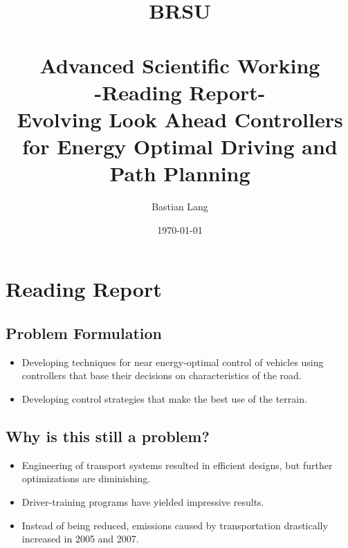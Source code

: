 \documentclass[paper=a4, fontsize=11pt]{scrartcl} %
\title{	
\normalfont \normalsize 
\textsc{BRSU} \\ [25pt] %
\horrule{0.5pt} \\[0.4cm] %
\huge Advanced Scientific Working\\-Reading Report-\\
Evolving Look Ahead Controllers for Energy Optimal Driving and Path Planning %
\horrule{2pt} \\[0.5cm] %
}
\author{Bastian Lang} %
\date{\normalsize\today} %
\numberwithin{equation}{section} %
\numberwithin{figure}{section} %
\numberwithin{table}{section} %
\begin{document}
\maketitle %

\newpage

\section{Reading Report}
\subsection{Problem Formulation}
\begin{itemize}
	\item Developing techniques for near energy-optimal control of vehicles using controllers that base their decisions on characteristics of the road.
	\item Developing control strategies that make the best use of the terrain.
\end{itemize}

\subsection{Why is this still a problem?}
\begin{itemize}
	\item Engineering of transport systems resulted in efficient designs, but further optimizations are diminishing.
	\item Driver-training programs have yielded impressive results.
	\item Instead of being reduced, emissions caused by transportation drastically increased in 2005 and 2007.
\end{itemize}
\end{document}
